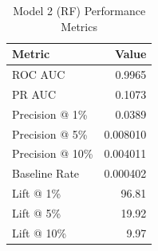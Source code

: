 \begin{table}[h]
\centering
\begin{tabular}{lr}
\toprule
Metric & Value \\
\midrule
ROC AUC & 0.9965 \\
PR AUC & 0.1073 \\
Precision @ 1\% & 0.0389 \\
Precision @ 5\% & 0.008010 \\
Precision @ 10\% & 0.004011 \\
Baseline Rate & 0.000402 \\
Lift @ 1\% & 96.81 \\
Lift @ 5\% & 19.92 \\
Lift @ 10\% & 9.97 \\
\bottomrule
\end{tabular}
\caption{Model 2 (RF) Performance Metrics}
\label{tab:model2_rf_metrics}
\end{table}
